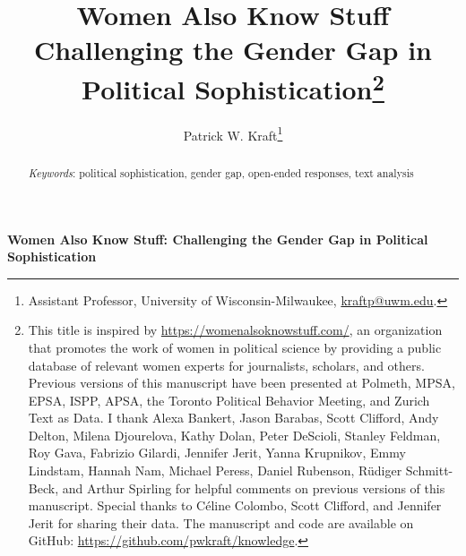 \documentclass[12pt]{article}
\author{Patrick W. Kraft\footnote{Assistant Professor, University of Wisconsin-Milwaukee, \href{mailto:kraftp@uwm.edu}{kraftp@uwm.edu}.}}
\title{Women Also Know Stuff \\
\large{Challenging the Gender Gap in Political Sophistication}\footnote{This title is inspired by \url{https://womenalsoknowstuff.com/}, an organization that promotes the work of women in political science by providing a public database of relevant women experts for journalists, scholars, and others. %
Previous versions of this manuscript have been presented at Polmeth, MPSA, EPSA, ISPP, APSA, the Toronto Political Behavior Meeting, and Zurich Text as Data. 
I thank Alexa Bankert, Jason Barabas, Scott Clifford, Andy Delton, Milena Djourelova, Kathy Dolan, Peter DeScioli, Stanley Feldman, Roy Gava, Fabrizio Gilardi, Jennifer Jerit, Yanna Krupnikov, Emmy Lindstam, Hannah Nam, Michael Peress, Daniel Rubenson, R\"udiger Schmitt-Beck, and Arthur Spirling for helpful comments on previous versions of this manuscript. Special thanks to C{\'e}line Colombo, Scott Clifford, and Jennifer Jerit for sharing their data. The manuscript and code are available on GitHub: \url{https://github.com/pwkraft/knowledge}.}
} %
\date{}
\begin{document}
\maketitle
\doublespacing
\thispagestyle{empty}


\hfill
\begin{abstract}\singlespacing
\noindent 


\vspace{\baselineskip}
\noindent \textit{Keywords}: political sophistication, gender gap, open-ended responses, text analysis

\vspace{\baselineskip}
\end{abstract}
\hfill

\newpage\setcounter{page}{1}


\clearpage
\singlespacing



\clearpage
\singlespacing
\renewcommand\thesubsection{\Roman{subsection}}
\setcounter{page}{1}
\appendices
\textbf{Women Also Know Stuff: Challenging the Gender Gap in Political Sophistication}

\startcontents[sections]
\clearpage


\end{document}
